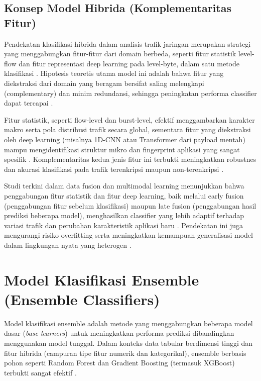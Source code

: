 \subsection{Konsep Model Hibrida (Komplementaritas Fitur)}
Pendekatan klasifikasi hibrida dalam analisis trafik jaringan merupakan strategi yang menggabungkan fitur-fitur dari domain berbeda, seperti fitur statistik level-flow dan fitur representasi deep learning pada level-byte, dalam satu metode klasifikasi \citep{Razooqi2025, Lotfollahi2019}. Hipotesis teoretis utama model ini adalah bahwa fitur yang diekstraksi dari domain yang beragam bersifat saling melengkapi (complementary) dan minim redundansi, sehingga peningkatan performa classifier dapat tercapai \citep{biscione2021convolutional, nie2025iot, Liu2024}.

Fitur statistik, seperti flow-level dan burst-level, efektif menggambarkan karakter makro serta pola distribusi trafik secara global, sementara fitur yang diekstraksi oleh deep learning (misalnya 1D-CNN atau Transformer dari payload mentah) mampu mengidentifikasi struktur mikro dan fingerprint aplikasi yang sangat spesifik \citep{Lotfollahi2019, kotak2025vpn}. Komplementaritas kedua jenis fitur ini terbukti meningkatkan robustnes dan akurasi klasifikasi pada trafik terenkripsi maupun non-terenkripsi \citep{Razooqi2025, nie2025iot, biscione2021convolutional}.

Studi terkini dalam data fusion dan multimodal learning menunjukkan bahwa penggabungan fitur statistik dan fitur deep learning, baik melalui early fusion (penggabungan fitur sebelum klasifikasi) maupun late fusion (penggabungan hasil prediksi beberapa model), menghasilkan classifier yang lebih adaptif terhadap variasi trafik dan perubahan karakteristik aplikasi baru \citep{nie2025iot, Lotfollahi2019, kotak2025vpn}. Pendekatan ini juga mengurangi risiko overfitting serta meningkatkan kemampuan generalisasi model dalam lingkungan nyata yang heterogen \citep{biscione2021convolutional}.

\section{Model Klasifikasi Ensemble (Ensemble Classifiers)}
\label{sec:bab2-ensemble}

Model klasifikasi ensemble adalah metode yang menggabungkan beberapa model dasar (\textit{base learners}) untuk meningkatkan performa prediksi dibandingkan menggunakan model tunggal. Dalam konteks data tabular berdimensi tinggi dan fitur hibrida (campuran tipe fitur numerik dan kategorikal), ensemble berbasis pohon seperti Random Forest dan Gradient Boosting (termasuk XGBoost) terbukti sangat efektif \citep{chen2016xgboost, breiman2001random}.

